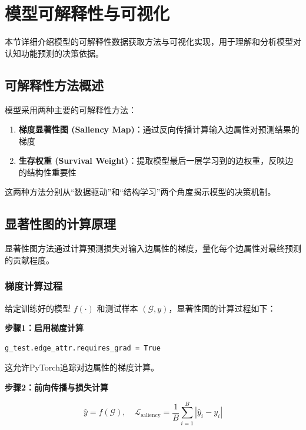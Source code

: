 \documentclass[UTF8, a4paper, 12pt]{article}
\begin{document}
\newpage

\section{模型可解释性与可视化}

本节详细介绍模型的可解释性数据获取方法与可视化实现，用于理解和分析模型对认知功能预测的决策依据。

\subsection{可解释性方法概述}

模型采用两种主要的可解释性方法：

\begin{enumerate}
    \item \textbf{梯度显著性图 (Saliency Map)}：通过反向传播计算输入边属性对预测结果的梯度
    \item \textbf{生存权重 (Survival Weight)}：提取模型最后一层学习到的边权重，反映边的结构性重要性
\end{enumerate}

这两种方法分别从``数据驱动''和``结构学习''两个角度揭示模型的决策机制。

\subsection{显著性图的计算原理}

显著性图方法通过计算预测损失对输入边属性的梯度，量化每个边属性对最终预测的贡献程度。

\subsubsection{梯度计算过程}

给定训练好的模型 $f(\cdot)$ 和测试样本 $(\mathcal{G}, y)$，显著性图的计算过程如下：

\textbf{步骤1：启用梯度计算}

\begin{verbatim}
g_test.edge_attr.requires_grad = True
\end{verbatim}

这允许PyTorch追踪对边属性的梯度计算。

\textbf{步骤2：前向传播与损失计算}

\begin{equation}
\hat{y} = f(\mathcal{G}), \quad \mathcal{L}_{\text{saliency}} = \frac{1}{B} \sum_{i=1}^{B} | \hat{y}_i - y_i |
\end{equation}
\end{document}
